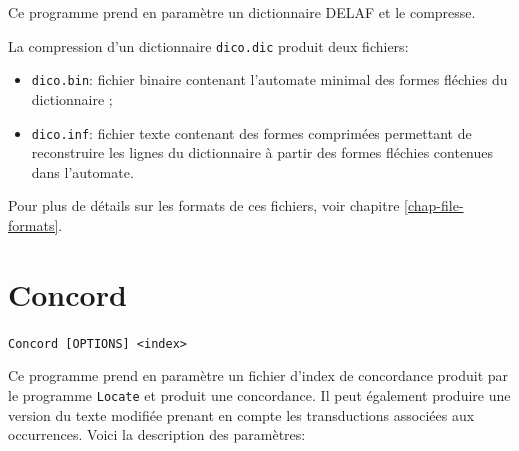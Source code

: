 \bigskip
\noindent Ce programme prend en paramètre un dictionnaire DELAF et le compresse.

La compression d’un dictionnaire \verb+dico.dic+ produit deux fichiers:
\begin{itemize}
  \item \verb+dico.bin+: fichier binaire contenant l’automate minimal des formes fléchies du
  	  dictionnaire ;
  \item \verb+dico.inf+: fichier texte contenant des formes comprimées permettant de reconstruire
les lignes du dictionnaire à partir des formes fléchies contenues dans l’automate.
\end{itemize}

\bigskip
\noindent Pour plus de détails sur les formats de ces fichiers, voir chapitre
\ref{chap-file-formats}.






\section{Concord}
\verb+Concord [OPTIONS] <index>+

\bigskip
\noindent Ce programme prend en paramètre un fichier d’index de concordance produit par le
programme \verb+Locate+ et produit une concordance. Il peut également produire une version
du texte modifiée prenant en compte les transductions associées aux occurrences. Voici la
description des paramètres:


